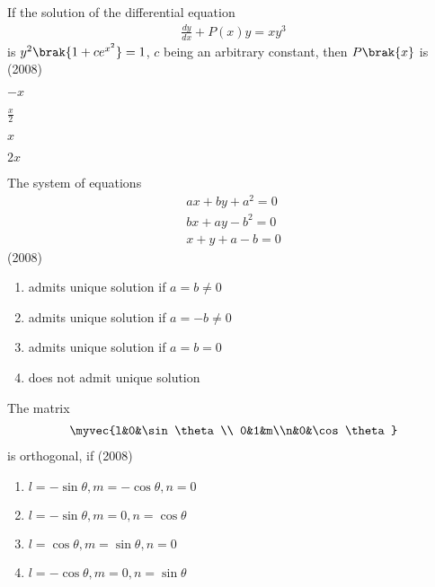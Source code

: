 	\item If the solution of the differential equation
          \begin{align*}
              \frac{d y}{d x}+P(x) y=x y^{3}
          \end{align*}
          is $y^{2}\brak{1+c e^{x^{2}}}=1$,
            $c$ being an arbitrary constant, then $P\brak{x}$ is
            \hfill{(2008)}
		\begin{enumerate}
             \begin{multicols}{4}  
		       \item $-x$
		       \item $\frac{x}{2}$
		       \item $x$
		       \item $2x$
             \end{multicols}
        	\end{enumerate}	
	\item The system of equations
            \begin{align*}
a x+b y+a^{2}=0 \\
b x+a y-b^{2}=0 \\
x+y+a-b=0
            \end{align*}
            \hfill{(2008)}
		\begin{enumerate}
			\item admits unique solution if $a=b \neq 0$
			\item admits unique solution if $a=-b \neq 0$
			\item admits unique solution if $a=b=0$
			\item does not admit unique solution
        	\end{enumerate}
	\item The matrix 
          \begin{align*}
              \myvec{l&0&\sin \theta \\ 0&1&m\\n&0&\cos \theta}
          \end{align*}
          is orthogonal, if
          \hfill{(2008)}
		\begin{enumerate}
              
		       \item $l=-\sin \theta, m=-\cos \theta, n=0$
		       \item $l=-\sin \theta, m=0, n=\cos \theta$
		       \item $l=\cos \theta, m=\sin \theta, n=0$
		       \item $l=-\cos \theta, m=0, n=\sin \theta$
            
        	\end{enumerate}	
